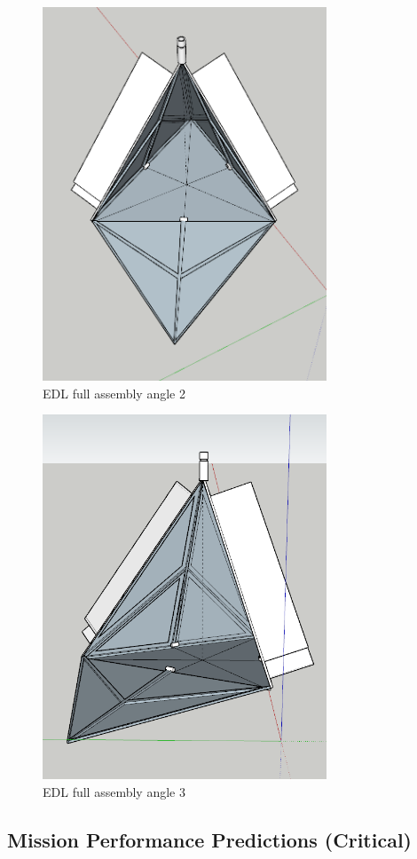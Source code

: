 \documentclass[%
 portrait,
 aapm,
 mph,%
 amsmath,amssymb,
 reprint,%
]{revtex4-2}
\begin{document}
\begin{figure}
  \includegraphics[width=240pt]{DescentandLanding/while_thing_2nd_angle.png}
   \caption{EDL full assembly angle 2}
\end{figure} 
\begin{figure}
  \includegraphics[width=240pt]{DescentandLanding/whole_thing_angle_3.png}
   \caption{EDL full assembly angle 3}
\end{figure} 

\subsection{Mission Performance Predictions (Critical)}
\end{document}
